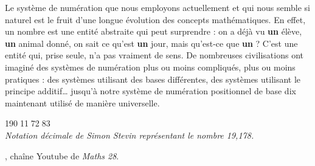 \vspace*{-7mm}
\begin{changemargin}{-15mm}{-15mm} 


\end{changemargin}
\vspace*{-11mm}
\begin{debat}   
   \begin{changemargin}{-15mm}{-15mm}
   Le système de numération que nous employons actuellement et qui nous semble si naturel est le fruit d'une longue évolution des concepts mathématiques. En effet, un nombre est une entité abstraite qui peut surprendre : on a déjà vu {\bf un} élève, {\bf un} animal donné, on sait ce qu'est {\bf un} jour, mais qu'est-ce que {\bf un} ? C'est une entité qui, prise seule, n'a pas vraiment de sens. De nombreuses civilisations ont imaginé des systèmes de numération plus ou moins compliqués, plus ou moins pratiques : des systèmes utilisant des bases différentes, des systèmes utilisant le principe additif\dots{} jusqu'à notre système de numération positionnel de base dix maintenant utilisé de manière universelle.
   \end{changemargin}
   \begin{center}
      \textcolor{B1}{{\huge 19\textcircled{\Large 0}1\textcircled{\Large 1}7\textcircled{\Large2}8\textcircled{\Large 3}} \\
      \it Notation décimale de Simon Stevin représentant le nombre 19,178.}
   \end{center}   
   \begin{cadre}[B2][J4]
      \begin{center}
         , chaîne Youtube de {\it Maths 28}.
      \end{center}
   \end{cadre}
\end{debat}